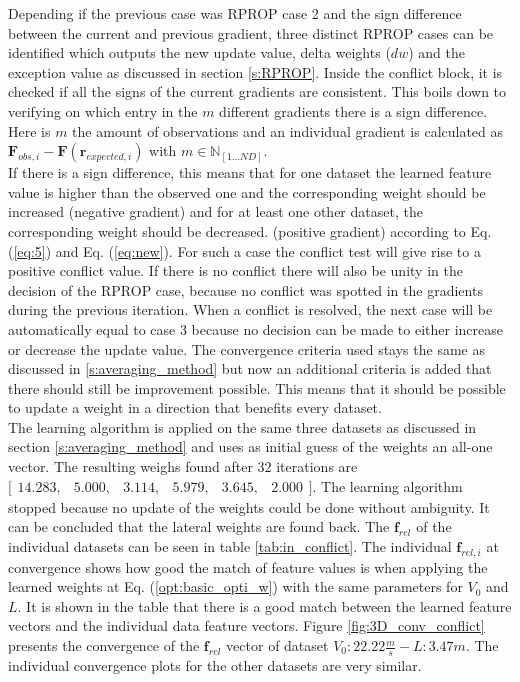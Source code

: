 Depending if the previous case was RPROP case 2 and the sign difference between the current and previous gradient, three distinct RPROP cases can be identified which outputs the new update value, delta weights ($dw$) and the exception value as discussed in section \ref{s:RPROP}. Inside the conflict block, it is checked if all the signs of the current gradients are consistent. This boils down to verifying on which entry in the $m$ different gradients there is a sign difference. Here is $m$ the amount of observations and an individual gradient is calculated as  $\bm{F}_{obs,i} - \bm{F}(\bm{r}_{expected,i})$ with $m \in \mathbb{N}_{[1\dots ND]}$. \\ 

If there is a sign difference, this means that for one dataset the learned feature value is higher than the observed one and the corresponding weight should be increased (negative gradient) and for at least one other dataset, the corresponding weight should be decreased. (positive gradient) according to Eq. (\ref{eq:5}) and Eq. (\ref{eq:new}). For such a case the conflict test will give rise to a positive conflict value. If there is no conflict there will also be unity in the decision of the RPROP case, because no conflict was spotted in the gradients during the previous iteration. When a conflict is resolved, the next case will be automatically equal to case 3 because no decision can be made to either increase or decrease the update value. The convergence criteria used stays the same as discussed in \ref{s:averaging_method} but now an additional criteria is added that there should still be improvement possible. This means that it should be possible to update a weight in a direction that benefits every dataset.\\

The learning algorithm is applied on the same three datasets as discussed in section \ref{s:averaging_method} and uses as initial guess of the weights an all-one vector. The resulting weighs found after $32$ iterations are  $\bigl[ \begin{smallmatrix} 14.283,&5.000,&3.114,&5.979,&3.645,&2.000\end{smallmatrix}\bigr]$. The learning algorithm stopped because no update of the weights could be done without ambiguity. It can be concluded that the lateral weights are found back. The $\bm{f}_{rel}$ of the individual datasets can be seen in table \ref{tab:in_conflict}. The individual $\bm{f}_{rel,i}$ at convergence shows how good the match of feature values is when applying the learned weights at Eq. (\ref{opt:basic_opti_w}) with the same parameters for $V_0$ and $L$. It is shown in the table that there is a good match between the learned feature vectors and the individual data feature vectors. Figure \ref{fig:3D_conv_conflict} presents the convergence of the $\bm{f}_{rel}$ vector of dataset $V_0:22.22\frac{m}{s}- L:3.47m$. The individual convergence plots for the other datasets are very similar.

